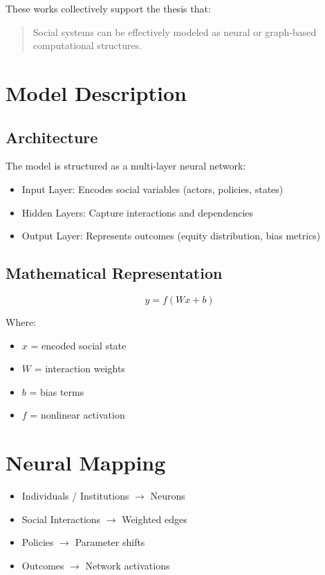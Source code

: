\documentclass[12pt]{article}
\begin{document}
These works collectively support the thesis that:
\begin{quote}
Social systems can be effectively modeled as neural or graph-based computational structures.
\end{quote}

\section*{Model Description}

\subsection*{Architecture}

The model is structured as a multi-layer neural network:

\begin{itemize}
\item Input Layer: Encodes social variables (actors, policies, states)
\item Hidden Layers: Capture interactions and dependencies
\item Output Layer: Represents outcomes (equity distribution, bias metrics)
\end{itemize}

\subsection*{Mathematical Representation}

\[
y = f(Wx + b)
\]

Where:
\begin{itemize}
\item $x$ = encoded social state
\item $W$ = interaction weights
\item $b$ = bias terms
\item $f$ = nonlinear activation
\end{itemize}

\section*{Neural Mapping}

\begin{itemize}
\item Individuals / Institutions $\rightarrow$ Neurons
\item Social Interactions $\rightarrow$ Weighted edges
\item Policies $\rightarrow$ Parameter shifts
\item Outcomes $\rightarrow$ Network activations
\end{itemize}
\end{document}
